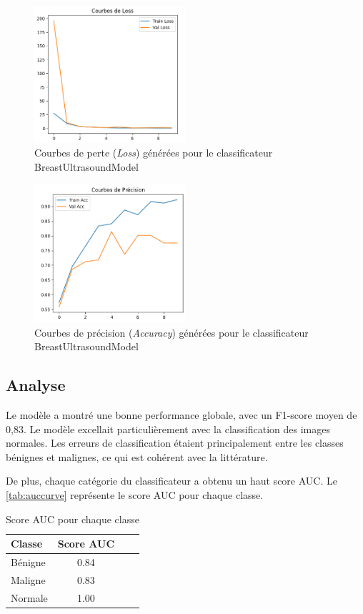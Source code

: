 \documentclass[a4paper,12pt]{article}
\begin{document}
\clearpage
\begin{figure}[h]
\centering
\includegraphics[width=0.5\textwidth]{loss_curve.png}
\caption{Courbes de perte (\textit{Loss}) générées pour le classificateur BreastUltrasoundModel}
\label{fig:losscurve}
\end{figure}

\begin{figure}[h]
\centering
\includegraphics[width=0.5\textwidth]{accuracy_curve.png}
\caption{Courbes de précision (\textit{Accuracy}) générées pour le classificateur BreastUltrasoundModel}
\label{fig:accuracycurve}
\end{figure}


\subsection{Analyse}
Le modèle a montré une bonne performance globale, avec un F1-score moyen de 0,83. Le modèle excellait particulièrement avec la classification des images normales. Les erreurs de classification étaient principalement entre les classes bénignes et malignes, ce qui est cohérent avec la littérature.

De plus, chaque catégorie du classificateur a obtenu un haut score AUC. Le \autoref{tab:auccurve} représente le score AUC pour chaque classe.

\begin{table}[h]
\centering
\caption{Score AUC pour chaque classe}
\begin{tabular}{lccc}
\toprule
Classe & Score AUC \\
\midrule
Bénigne & 0.84 \\
Maligne & 0.83 \\
Normale & 1.00 \\
\bottomrule
\end{tabular}
\label{tab:auccurve}
\end{table}
\end{document}
